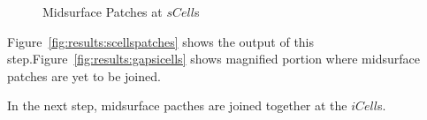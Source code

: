 

\begin{figure}[!h]
\centering     %
{}\hfill
{}
\caption{Midsurface Patches at $sCell$s}\label{fig:results:enlosurescells}
\end{figure}




Figure~\ref{fig:results:scellspatches} shows the output of this step.Figure~\ref{fig:results:gapsicells} shows magnified portion where midsurface patches are yet to be joined.

In the next step, midsurface pacthes are joined together at the $iCell$s. %


